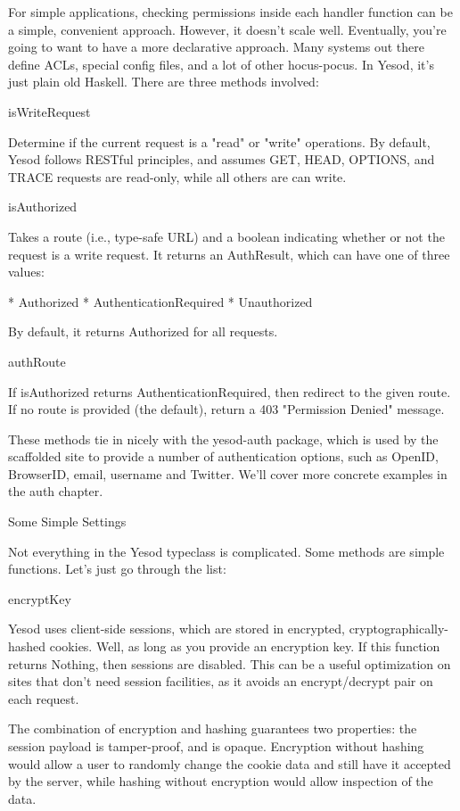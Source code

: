 For simple applications, checking permissions inside each handler function can be a simple, convenient approach. However, it doesn't scale well. Eventually, you're going to want to have a more declarative approach. Many systems out there define ACLs, special config files, and a lot of other hocus-pocus. In Yesod, it's just plain old Haskell. There are three methods involved:

isWriteRequest

Determine if the current request is a "read" or "write" operations. By default, Yesod follows RESTful principles, and assumes GET, HEAD, OPTIONS, and TRACE requests are read-only, while all others are can write.

isAuthorized

Takes a route (i.e., type-safe URL) and a boolean indicating whether or not the request is a write request. It returns an AuthResult, which can have one of three values:

* Authorized
* AuthenticationRequired
* Unauthorized

By default, it returns Authorized for all requests.

authRoute

If isAuthorized returns AuthenticationRequired, then redirect to the given route. If no route is provided (the default), return a 403 "Permission Denied" message.

These methods tie in nicely with the yesod-auth package, which is used by the scaffolded site to provide a number of authentication options, such as OpenID, BrowserID, email, username and Twitter. We'll cover more concrete examples in the auth chapter.

Some Simple Settings

Not everything in the Yesod typeclass is complicated. Some methods are simple functions. Let's just go through the list:

encryptKey

Yesod uses client-side sessions, which are stored in encrypted, cryptographically-hashed cookies. Well, as long as you provide an encryption key. If this function returns Nothing, then sessions are disabled. This can be a useful optimization on sites that don't need session facilities, as it avoids an encrypt/decrypt pair on each request.

The combination of encryption and hashing guarantees two properties: the session payload is tamper-proof, and is opaque. Encryption without hashing would allow a user to randomly change the cookie data and still have it accepted by the server, while hashing without encryption would allow inspection of the data.

